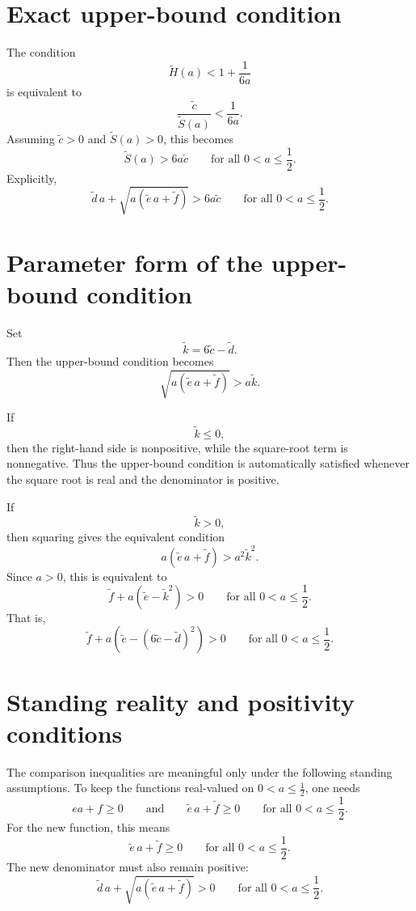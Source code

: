 \documentclass[11pt]{article}
\begin{document}
\section{Exact upper-bound condition}

The condition
\[
\widetilde H(a)<1+\frac{1}{6a}
\]
is equivalent to
\[
\frac{\widetilde c}{\widetilde S(a)}
<
\frac{1}{6a}.
\]
Assuming \(\widetilde c>0\) and \(\widetilde S(a)>0\), this becomes
\[
\boxed{
\widetilde S(a)>6a\widetilde c
\qquad
\text{for all }0<a\le\frac12.
}
\]
Explicitly,
\[
\boxed{
\widetilde d\,a+\sqrt{a(\widetilde e\,a+\widetilde f)}
>
6a\widetilde c
\qquad
\text{for all }0<a\le\frac12.
}
\]

\section{Parameter form of the upper-bound condition}

Set
\[
\widetilde k=6\widetilde c-\widetilde d.
\]
Then the upper-bound condition becomes
\[
\sqrt{a(\widetilde e\,a+\widetilde f)}
>
a\widetilde k.
\]

If
\[
\widetilde k\le 0,
\]
then the right-hand side is nonpositive, while the square-root term is nonnegative.
Thus the upper-bound condition is automatically satisfied whenever the square root is real and the denominator is positive.

If
\[
\widetilde k>0,
\]
then squaring gives the equivalent condition
\[
a(\widetilde e\,a+\widetilde f)
>
a^2\widetilde k^2.
\]
Since \(a>0\), this is equivalent to
\[
\boxed{
\widetilde f+a\left(\widetilde e-\widetilde k^2\right)>0
\qquad
\text{for all }0<a\le\frac12.
}
\]
That is,
\[
\boxed{
\widetilde f+a\left(\widetilde e-(6\widetilde c-\widetilde d)^2\right)>0
\qquad
\text{for all }0<a\le\frac12.
}
\]

\section{Standing reality and positivity conditions}

The comparison inequalities are meaningful only under the following standing assumptions. To keep the functions real-valued on \(0<a\le\frac12\), one needs
\[
\boxed{
ea+f\ge 0
\qquad
\text{and}
\qquad
\widetilde e\,a+\widetilde f\ge 0
\qquad
\text{for all }0<a\le\frac12.
}
\]
For the new function, this means
\[
\boxed{
\widetilde e\,a+\widetilde f\ge 0
\qquad
\text{for all }0<a\le\frac12.
}
\]
The new denominator must also remain positive:
\[
\boxed{
\widetilde d\,a+\sqrt{a(\widetilde e\,a+\widetilde f)}>0
\qquad
\text{for all }0<a\le\frac12.
}
\]
\end{document}
